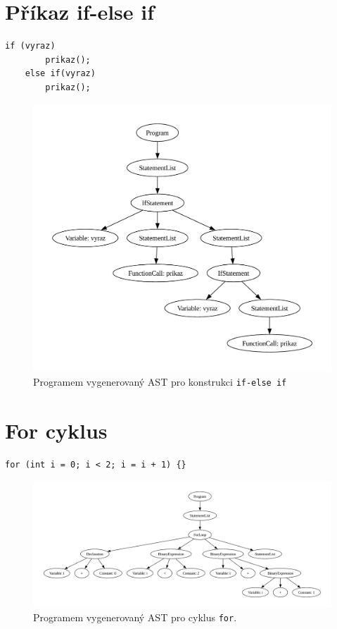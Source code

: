 \section{Příkaz if-else if}
\begin{lstlisting}[language=Koubp]
    if (vyraz)
        prikaz();
    else if(vyraz)
        prikaz();
\end{lstlisting}
\begin{figure}[ht]
    \centering
    \includegraphics[width=\textwidth]{obrazky-figures/ast_if_else_if.pdf}
    \caption{Programem vygenerovaný AST pro konstrukci \texttt{if-else if}}
    \label{fig_ast_else_if}
\end{figure}

\newpage
\section{For cyklus}

\begin{lstlisting}[language=Koubp]
    for (int i = 0; i < 2; i = i + 1) {}
\end{lstlisting}
\begin{figure}[h]
    \centering
    \includegraphics[width=\textwidth]{obrazky-figures/tree_for.pdf}
    \caption{Programem vygenerovaný AST pro cyklus \texttt{for}.}
    \label{fig_ast_for}
\end{figure}
\newpage
